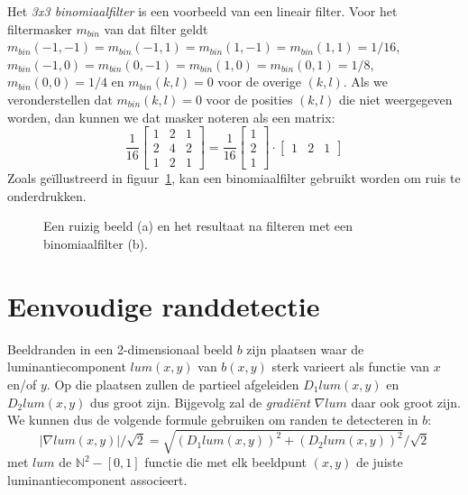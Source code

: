 Het \emph{3x3 binomiaalfilter} is een voorbeeld van een lineair filter. Voor het filtermasker 
$m_{bin}$ van dat filter geldt $m_{bin}(-1,-1)=m_{bin}(-1,1)=m_{bin}(1,-1)=m_{bin}(1,1)=1/16$, 
$m_{bin}(-1,0)=m_{bin}(0,-1)=m_{bin}(1,0)=m_{bin}(0,1)=1/8$, $m_{bin}(0,0)=1/4$ en 
$m_{bin}(k,l)=0$ voor de overige $(k,l)$. Als we veronderstellen dat $m_{bin}(k,l)=0$ voor de 
posities $(k,l)$ die niet weergegeven worden, dan kunnen we dat masker noteren als een matrix:
\begin{displaymath}
\frac{1}{16}\left[ \begin{array}{ccc} 1 & 2 & 1\\ 2 & 4 & 2\\ 1 & 2 & 1 \end{array} \right]
= \frac{1}{16}\left[ \begin{array}{c} 1\\ 2\\ 1 \end{array} \right] \cdot 
\left[ \begin{array}{ccc} 1 & 2 & 1 \end{array} \right]
\end{displaymath}
Zoals ge\"illustreerd in figuur~\ref{fig:indische_ruizig_en_binom}, kan een binomiaalfilter gebruikt worden om ruis te onderdrukken.

\begin{figure}[tb]
\begin{center}
\hspace{1cm}
\caption{\label{fig:indische_ruizig_en_binom}Een ruizig beeld (a) en het resultaat na filteren met een binomiaalfilter (b).}
\end{center}
\end{figure}

\section{Eenvoudige randdetectie}
\label{sectie:randdetectie}

Beeldranden in een 2-dimensionaal beeld $b$ zijn plaatsen waar de luminantiecomponent $lum(x,y)$ van $b(x,y)$ 
sterk varieert als functie van $x$ en/of $y$. Op die plaatsen zullen de partieel afgeleiden $D_1 lum(x,y)$ en 
$D_2 lum(x,y)$ dus groot zijn. Bijgevolg zal de \emph{gradi\"ent} $\nabla lum$ daar ook groot zijn. We kunnen 
dus de volgende formule gebruiken om randen te detecteren in $b$: 
\begin{displaymath}
|\nabla lum(x,y)| / \sqrt{2} = \sqrt{(D_1 lum(x,y))^2 + (D_2 lum(x,y))^2} / \sqrt{2}
\end{displaymath}
met $lum$ de $\mathbb{N}^2 - [0,1]$ functie die met elk beeldpunt $(x,y)$ de juiste luminantiecomponent associeert.

